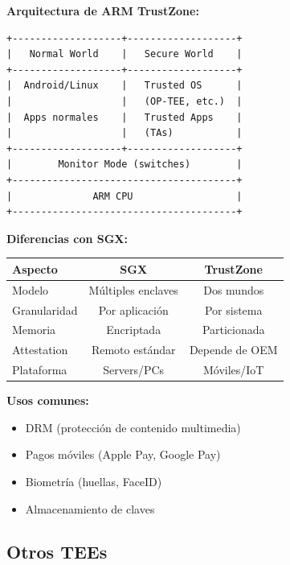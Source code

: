 \documentclass[11pt,a4paper,twoside]{book}
\begin{document}
\begin{mathnote}
\textbf{Arquitectura de ARM TrustZone:}

\begin{verbatim}
+-------------------+-------------------+
|   Normal World    |   Secure World    |
+-------------------+-------------------+
|  Android/Linux    |   Trusted OS      |
|                   |   (OP-TEE, etc.)  |
|  Apps normales    |   Trusted Apps    |
|                   |   (TAs)           |
+-------------------+-------------------+
|        Monitor Mode (switches)        |
+---------------------------------------+
|              ARM CPU                  |
+---------------------------------------+
\end{verbatim}

\textbf{Diferencias con SGX:}
\begin{center}
\begin{tabular}{lcc}
\toprule
\textbf{Aspecto} & \textbf{SGX} & \textbf{TrustZone} \\
\midrule
Modelo & M\'ultiples enclaves & Dos mundos \\
Granularidad & Por aplicaci\'on & Por sistema \\
Memoria & Encriptada & Particionada \\
Attestation & Remoto est\'andar & Depende de OEM \\
Plataforma & Servers/PCs & M\'oviles/IoT \\
\bottomrule
\end{tabular}
\end{center}

\textbf{Usos comunes:}
\begin{itemize}
    \item DRM (protecci\'on de contenido multimedia)
    \item Pagos m\'oviles (Apple Pay, Google Pay)
    \item Biometr\'ia (huellas, FaceID)
    \item Almacenamiento de claves
\end{itemize}
\end{mathnote}

\subsection{Otros TEEs}
\end{document}
